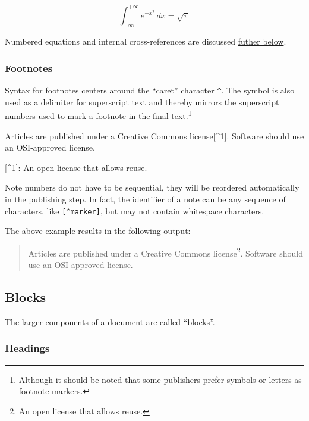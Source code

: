 \documentclass[
]{article}
\newenvironment{Shaded}{}{}
\newcommand{\NormalTok}[1]{#1}
\newcommand{\OtherTok}[1]{\textcolor[rgb]{0.00,0.44,0.13}{#1}}
\begin{document}
\[\int_{-\infty}^{+\infty} e^{-x^2} \, dx = \sqrt{\pi}\]

Numbered equations and internal cross-references are discussed
\protect\hyperlink{equations}{futher below}.

\hypertarget{footnotes}{%
\subsubsection{Footnotes}\label{footnotes}}

Syntax for footnotes centers around the ``caret'' character
\texttt{\^{}}. The symbol is also used as a delimiter for superscript
text and thereby mirrors the superscript numbers used to mark a footnote
in the final text.\footnote{Although it should be noted that some
  publishers prefer symbols or letters as footnote markers.}

\begin{Shaded}
\begin{Highlighting}[]
\NormalTok{Articles are published under a Creative Commons license}\OtherTok{[\^{}1]}\NormalTok{.}
\NormalTok{Software should use an OSI{-}approved license.}

\OtherTok{[\^{}1]: }\NormalTok{An open license that allows reuse.}
\end{Highlighting}
\end{Shaded}

Note numbers do not have to be sequential, they will be reordered
automatically in the publishing step. In fact, the identifier of a note
can be any sequence of characters, like \texttt{{[}\^{}marker{]}}, but
may not contain whitespace characters.

The above example results in the following output:

\begin{quote}
Articles are published under a Creative Commons license\footnote{An open
  license that allows reuse.}. Software should use an OSI-approved
license.
\end{quote}

\hypertarget{blocks}{%
\subsection{Blocks}\label{blocks}}

The larger components of a document are called ``blocks''.

\hypertarget{headings}{%
\subsubsection{Headings}\label{headings}}
\end{document}
